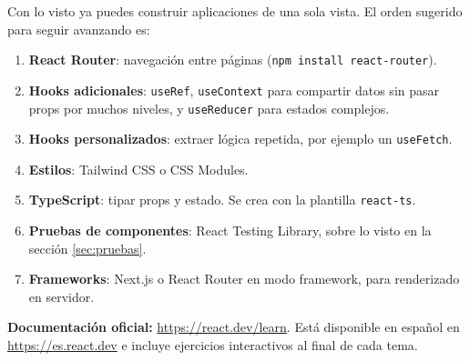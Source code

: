 \documentclass[11pt,a4paper]{article}
\newcommand{\cmd}[1]{\texttt{\color{reactdark}#1}}
\begin{document}
Con lo visto ya puedes construir aplicaciones de una sola vista. El orden sugerido para seguir avanzando es:

\begin{enumerate}[leftmargin=*]
  \item \textbf{React Router}: navegación entre páginas (\cmd{npm install react-router}).
  \item \textbf{Hooks adicionales}: \cmd{useRef}, \cmd{useContext} para compartir datos sin pasar props por muchos niveles, y \cmd{useReducer} para estados complejos.
  \item \textbf{Hooks personalizados}: extraer lógica repetida, por ejemplo un \cmd{useFetch}.
  \item \textbf{Estilos}: Tailwind CSS o CSS Modules.
  \item \textbf{TypeScript}: tipar props y estado. Se crea con la plantilla \cmd{react-ts}.
  \item \textbf{Pruebas de componentes}: React Testing Library, sobre lo visto en la sección \ref{sec:pruebas}.
  \item \textbf{Frameworks}: Next.js o React Router en modo framework, para renderizado en servidor.
\end{enumerate}

\textbf{Documentación oficial:} \url{https://react.dev/learn}. Está disponible en español en \url{https://es.react.dev} e incluye ejercicios interactivos al final de cada tema.
\end{document}
